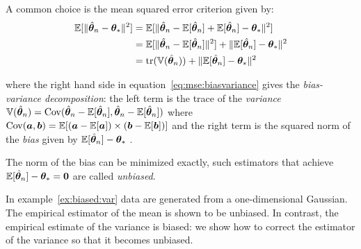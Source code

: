 A common choice is the mean squared error criterion given by:
\begin{align}
  \mathbb{E}[\|\hat{\boldsymbol{\theta}}_n - \boldsymbol{\theta}_*\|^2] &= \mathbb{E}[\|\hat{\boldsymbol{\theta}}_n - \mathbb{E}[\hat{\boldsymbol{\theta}}_n] + \mathbb{E}[\hat{\boldsymbol{\theta}}_n] - \boldsymbol{\theta}_*\|^2] \\
                                   &= \mathbb{E}[\|\hat{\boldsymbol{\theta}}_n - \mathbb{E}[\hat{\boldsymbol{\theta}}_n]\|^2] + \|\mathbb{E}[\hat{\boldsymbol{\theta}}_n] - \boldsymbol{\theta}_*\|^2  \\
                                         &= \mathop{\mathrm{tr}}(\mathbb{V}(\hat{\boldsymbol{\theta}}_n)) + \|\mathbb{E}[\hat{\boldsymbol{\theta}}_n] - \boldsymbol{\theta}_*\|^2 \label{eq:mse:biasvariance}
\end{align}

where the right hand side in equation~\ref{eq:mse:biasvariance} gives the
\emph{bias-variance decomposition}: the left term is the trace of the \emph{variance} $\mathbb{V}(\hat{\boldsymbol{\theta}}_n) = \operatorname*{Cov}(\hat{\boldsymbol{\theta}}_n -
\mathbb{E}[\hat{\boldsymbol{\theta}}_n], \hat{\boldsymbol{\theta}}_n -
\mathbb{E}[\hat{\boldsymbol{\theta}}_n])$ where $\operatorname*{Cov}(\boldsymbol{a}, \boldsymbol{b}) = \mathbb{E}[(\boldsymbol{a} - \mathbb{E}[\boldsymbol{a}]) \times (\boldsymbol{b} -
\mathbb{E}[\boldsymbol{b}])]$ and the right term is the squared norm of the \emph{bias} given by $\mathbb{E}[\hat{\boldsymbol{\theta}}_n] - \boldsymbol{\theta}_*$ .

The norm of the bias can be minimized exactly, such estimators that achieve $\mathbb{E}[\hat{\boldsymbol{\theta}}_n] - \boldsymbol{\theta}_* = \boldsymbol{0}$ are called \emph{unbiased}.

In example~\ref{ex:biased:var} data are generated from a one-dimensional
Gaussian. The empirical estimator of the mean is shown to be unbiased. In
contrast, the empirical estimate of the variance is biased: we show how to
correct the estimator of the variance so that it becomes unbiased.

